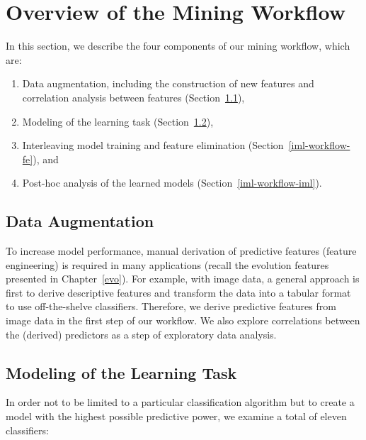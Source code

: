 \documentclass[
  oneside]{book}
\providecommand{\tightlist}{%
  \setlength{\itemsep}{0pt}\setlength{\parskip}{0pt}}
\begin{document}
\hypertarget{iml-workflow}{%
\section{Overview of the Mining Workflow}\label{iml-workflow}}

In this section, we describe the four components of our mining workflow, which are:

\begin{enumerate}
\def\labelenumi{\arabic{enumi}.}
\tightlist
\item
  Data augmentation, including the construction of new features and correlation analysis between features (Section~\ref{iml-workflow-data-augmentation}),
\item
  Modeling of the learning task (Section~\ref{iml-workflow-modeling}),
\item
  Interleaving model training and feature elimination (Section~\ref{iml-workflow-fe}), and
\item
  Post-hoc analysis of the learned models (Section~\ref{iml-workflow-iml}).
\end{enumerate}

\hypertarget{iml-workflow-data-augmentation}{%
\subsection{Data Augmentation}\label{iml-workflow-data-augmentation}}

To increase model performance, manual derivation of predictive features (feature engineering) is required in many applications (recall the evolution features presented in Chapter~\ref{evo}).
For example, with image data, a general approach is first to derive descriptive features and transform the data into a tabular format to use off-the-shelve classifiers.
Therefore, we derive predictive features from image data in the first step of our workflow.
We also explore correlations between the (derived) predictors as a step of exploratory data analysis.

\hypertarget{iml-workflow-modeling}{%
\subsection{Modeling of the Learning Task}\label{iml-workflow-modeling}}

In order not to be limited to a particular classification algorithm but to create a model with the highest possible predictive power, we examine a total of eleven classifiers:
\end{document}
